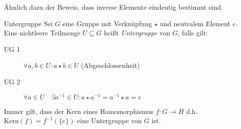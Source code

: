 \bemerkung
Ähnlich dazu der Beweis, dass inverse Elemente eindeutig bestimmt sind.


\begin{definition}{Untergruppe}
	Sei $G$ eine Gruppe mit Verknüpfung $\star$ und neutralem Element $e$.\\
	Eine nichtleere Teilmenge $U\subseteq G$ heißt \emph{Untergruppe} von $G$, falls gilt:
	\begin{description}
	  \item[UG 1] $\forall a,b\in U : a\star b\in U$ (Abgeschlossenheit)
	  \item[UG 2] $\forall a\in U \quad \exists a^{-1}\in U: a\star a^{-1}=a^{-1}\star a =e $
	\end{description}
\end{definition}

\bemerkung
Immer gilt, dass der Kern eines Homomorphismus $f:G \rightarrow H$ d.h. $\mathrm{Kern}(f)=f^{-1}(\{e\})$  eine Untergruppe von $G$ ist.
